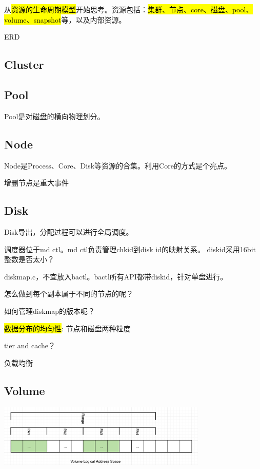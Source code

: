 从\hl{资源的生命周期模型}开始思考。资源包括：\hl{集群、节点、core、磁盘、pool、volume、snapshot}等，以及内部资源。

ERD

\subsection{Cluster}

\subsection{Pool}

Pool是对磁盘的横向物理划分。

\subsection{Node}

Node是Process、Core、Disk等资源的合集。利用Core的方式是个亮点。

增删节点是重大事件

\subsection{Disk}

Disk导出，分配过程可以进行全局调度。

调度器位于md ctl。md ctl负责管理chkid到disk id的映射关系。
diskid采用16bit整数是否太小？

diskmap.c，不宜放入bactl。bactl所有API都带diskid，针对单盘进行。

怎么做到每个副本属于不同的节点的呢？

如何管理diskmap的版本呢？

\hl{数据分布的均匀性}: 节点和磁盘两种粒度

tier and cache？

负载均衡

\subsection{Volume}

\begin{center}
\includegraphics[width=10cm]{../imgs/volume-addressspace.png}
\end{center}

